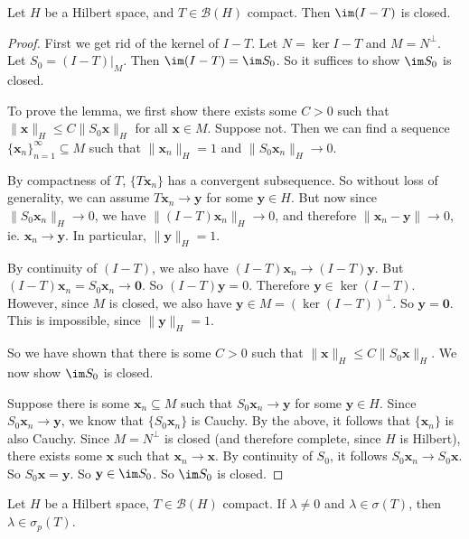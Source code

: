 \documentclass[a4paper]{article}
\begin{document}
\begin{lemma}
  Let $H$ be a Hilbert space, and $T \in \mathcal{B}(H)$ compact. Then $\im (I - T)$ is closed.
\end{lemma}

\begin{proof}
  First we get rid of the kernel of $I - T$. Let $N = \ker I - T$ and $M = N^\perp$. Let $S_0 = (I - T)|_{M}$. Then $\im (I - T) = \im S_0$. So it suffices to show $\im S_0$ is closed.

  To prove the lemma, we first show there exists some $C > 0$ such that $\|\mathbf{x}\|_H \leq C \|S_0 \mathbf{x}\|_H$ for all $\mathbf{x} \in M$. Suppose not. Then we can find a sequence $\{\mathbf{x}_n\}_{n = 1}^\infty \subseteq M$ such that $\|\mathbf{x}_n\|_H = 1$ and $\|S_0 \mathbf{x}_n\|_H \to 0$.

  By compactness of $T$, $\{T \mathbf{x}_n\}$ has a convergent subsequence. So without loss of generality, we can assume $T \mathbf{x}_n \to \mathbf{y}$ for some $\mathbf{y} \in H$. But now since $\|S_0 \mathbf{x}_n\|_H \to 0$, we have $\|(I - T) \mathbf{x}_n\|_H \to 0$, and therefore $\|\mathbf{x}_n - \mathbf{y}\| \to 0$, ie. $\mathbf{x}_n \to \mathbf{y}$. In particular, $\|\mathbf{y}\|_H = 1$.

  By continuity of $(I - T)$, we also have $(I - T) \mathbf{x}_n \to (I - T) \mathbf{y}$. But $(I - T) \mathbf{x}_n = S_0 \mathbf{x}_n \to \mathbf{0}$. So $(I - T) \mathbf{y} = 0$. Therefore $\mathbf{y} \in \ker(I - T)$. However, since $M$ is closed, we also have $\mathbf{y} \in M = (\ker (I - T))^\perp$. So $\mathbf{y} = \mathbf{0}$. This is impossible, since $\|\mathbf{y}\|_H = 1$.

  So we have shown that there is some $C > 0$ such that $\|\mathbf{x}\|_H \leq C \|S_0 \mathbf{x}\|_H$. We now show $\im S_0$ is closed.

  Suppose there is some $\mathbf{x}_n \subseteq M$ such that $S_0 \mathbf{x}_n \to \mathbf{y}$ for some $\mathbf{y} \in H$. Since $S_0 \mathbf{x}_n \to \mathbf{y}$, we know that $\{S_0 \mathbf{x}_n\}$ is Cauchy. By the above, it follows that $\{\mathbf{x}_n\}$ is also Cauchy. Since $M = N^\perp$ is closed (and therefore complete, since $H$ is Hilbert), there exists some $\mathbf{x}$ such that $\mathbf{x}_n \to \mathbf{x}$. By continuity of $S_0$, it follows $S_0 \mathbf{x}_n \to S_0 \mathbf{x}$. So $S_0 \mathbf{x} = \mathbf{y}$. So $\mathbf{y} \in \im S_0$. So $\im S_0$ is closed.
\end{proof}

\begin{prop}
  Let $H$ be a Hilbert space, $T \in \mathcal{B}(H)$ compact. If $\lambda \not= 0$ and $\lambda \in \sigma(T)$, then $\lambda \in \sigma_p(T)$.
\end{prop}
\end{document}
